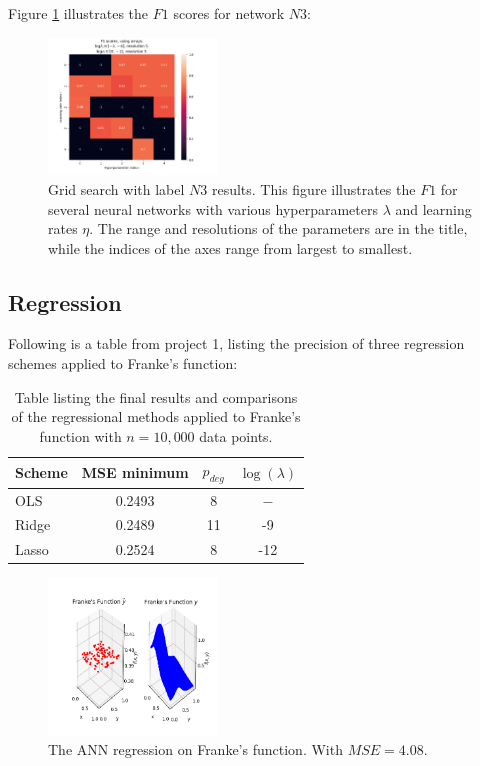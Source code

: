         Figure \ref{fig:ANNREG3} illustrates the $F1$ scores for network $N3$:
        \begin{figure}
            \centering
            \includegraphics[width=0.4\textwidth]{figures/Ngrid3_F1.png}
            \caption{Grid search with label $N3$ results. This figure illustrates the $F1$ for several neural networks with various hyperparameters $\lambda$ and learning rates $\eta$. The range and resolutions of the parameters are in the title, while the indices of the axes range from largest to smallest.}
            \label{fig:ANNREG3}
        \end{figure}
        
        
    \subsection{Regression}
        Following is a table from project 1, listing the precision of three regression schemes applied to Franke's function:
        \begin{table}[H]
            \centering
            \caption{Table listing the final results and comparisons of the regressional methods applied to Franke's function with $n=10,000$ data points.}
            \begin{tabular}[t]{l@{\hskip 0.3in}c@{\hskip 0.3in}c@{\hskip 0.2in}c}
                \toprule
                Scheme & MSE minimum & $p_{deg}$ & $\log(\lambda)$ \\
                \midrule
                OLS & 0.2493 & 8 & $-$\\
                Ridge & 0.2489 & 11 & -9\\
                Lasso & 0.2524 & 8 & -12\\
                \bottomrule
            \end{tabular}
            \label{tab:conclusion_table_Frankes}
        \end{table}
        
        
        \begin{figure}
            \centering
            \includegraphics[width=0.4\textwidth]{figures/regression_NNW.png}
            \caption{The ANN regression on Franke's function. With $MSE=4.08$.}
            \label{fig:ANNREG}
        \end{figure}
        
        
